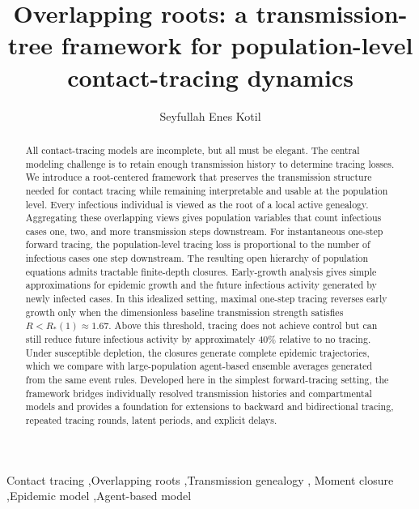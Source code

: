 \documentclass[review,12pt]{elsarticle}
\numberwithin{equation}{section}
\theoremstyle{remark}
\begin{document}
\linenumbers

\begin{frontmatter}

\title{Overlapping roots: a transmission-tree framework for population-level contact-tracing dynamics}

\author[a,b]{Seyfullah Enes Kotil}



\begin{abstract}
All contact-tracing models are incomplete, but all must be elegant. The central modeling challenge is to retain enough transmission history to determine tracing losses. We introduce a root-centered framework that preserves the transmission structure needed for contact tracing while remaining interpretable and usable at the population level. Every infectious individual is viewed as the root of a local active genealogy. Aggregating these overlapping views gives population variables that count infectious cases one, two, and more transmission steps downstream. For instantaneous one-step forward tracing, the population-level tracing loss is proportional to the number of infectious cases one step downstream. The resulting open hierarchy of population equations admits tractable finite-depth closures. Early-growth analysis gives simple approximations for epidemic growth and the future infectious activity generated by newly infected cases. In this idealized setting, maximal one-step tracing reverses early growth only when the dimensionless baseline transmission strength satisfies $R<R_*(1)\approx 1.67$. Above this threshold, tracing does not achieve control but can still reduce future infectious activity by approximately 40\% relative to no tracing. Under susceptible depletion, the closures generate complete epidemic trajectories, which we compare with large-population agent-based ensemble averages generated from the same event rules. Developed here in the simplest forward-tracing setting, the framework bridges individually resolved transmission histories and compartmental models and provides a foundation for extensions to backward and bidirectional tracing, repeated tracing rounds, latent periods, and explicit delays.
\end{abstract}

\begin{keyword}
Contact tracing \sep Overlapping roots \sep Transmission genealogy \sep
Moment closure \sep Epidemic model \sep Agent-based model
\end{keyword}

\end{frontmatter}
\end{document}
